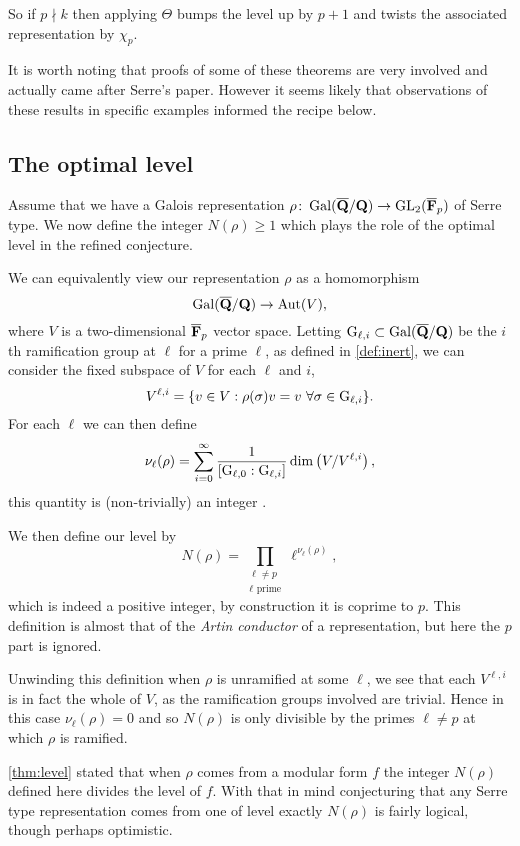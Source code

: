 \documentclass[a4paper,12pt]{article}
\begin{document}
So if $p\nmid k$ then applying $\Theta$ bumps the level up by $p+1$ and twists the associated representation by $\chi_p$.

It is worth noting that proofs of some of these theorems are very involved and actually came after Serre's paper.
However it seems likely that observations of these results in specific examples informed the recipe below.


\subsection{The optimal level}\label{subsec:level}
Assume that we have a Galois representation $\rho\colon \operatorname{Gal}(\overline{\mathbf{Q}}/\mathbf{Q}) \to \operatorname{GL}_2(\overline{\mathbf{F}}_p)$ of Serre type.
We now define the integer $N(\rho) \ge 1$ which plays the role of the optimal level in the refined conjecture.

We can equivalently view our representation $\rho$ as a homomorphism
\[
\operatorname{Gal}(\overline{\mathbf{Q}}/\mathbf{Q}) \to \operatorname{Aut}(V),
\]
where $V$ is a two-dimensional $\overline{\mathbf{F}}_p$ vector space.
Letting $\mathrm{G}_{\ell,i}\subset \operatorname{Gal}(\overline{\mathbf{Q}}/\mathbf{Q})$ be the $i$th ramification group at $\ell$ for a prime $\ell$, as defined in \cref{def:inert}, we can consider the fixed subspace of $V$ for each $\ell$ and $i$,
\[
V^{\ell,i} = \{v\in V : \rho(\sigma) v = v\ \forall \sigma \in \G_{\ell,i}\}.
\]
For each $\ell$ we can then define
\[
\nu_\ell(\rho) = \sum_{i = 0}^{\infty} \frac{1}{[\mathrm{G}_{\ell,0} : \mathrm{G}_{\ell,i}]} \dim\left(V/V^{\ell,i}\right),
\]
this quantity is (non-trivially) an integer \cite[p. 99]{SerreLF}.

We then define our level by
\[
N(\rho) = \prod_{\substack{\ell \ne p\\ \ell\text{ prime}}} \ell^{\nu_\ell(\rho)},
\]
which is indeed a positive integer, by construction it is coprime to $p$.
This definition is almost that of the \emph{Artin conductor} of a representation, but here the $p$ part is ignored.

\begin{rmk}\label{rmk:unram}
Unwinding this definition when $\rho$ is unramified at some $\ell$, we see that each $V^{\ell,i}$ is in fact the whole of $V$, as the ramification groups involved are trivial.
Hence in this case $\nu_\ell(\rho) = 0$ and so $N(\rho)$ is only divisible by the primes $\ell \ne p$ at which $\rho$ is ramified.
\end{rmk}

\cref{thm:level} stated that when $\rho$ comes from a modular form $f$ the integer $N(\rho)$ defined here divides the level of $f$.
With that in mind conjecturing that any Serre type representation comes from one of level exactly $N(\rho)$ is fairly logical, though perhaps optimistic.
\end{document}
